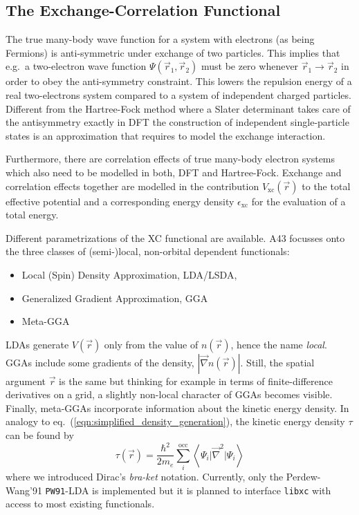 \documentclass[oribibl]{llncs}
\newcommand{\um}[1]{_{\mathrm{#1}}}
\newcommand{\ttt}[1]{\texttt{#1}}
\newcommand{\braketop}[3]{\left\langle \left. #1 \right| #2 \left| #3 \right. \right\rangle}
\newcommand{\codename}{A43}
\begin{document}
\subsection{The Exchange-Correlation Functional} \label{sec:xc-functional}
%
The true many-body wave function for a system with electrons (as being Fermions)
is anti-symmetric under exchange of two particles. 
This implies that e.g.~a two-electron wave function $\Psi(\vec r_1,\vec r_2)$ must be zero 
whenever $\vec r_1 \rightarrow \vec r_2$ in order to obey the anti-symmetry constraint.
This lowers the repulsion energy of a real two-electrons system compared to a
system of independent charged particles.
Different from the Hartree-Fock method where a Slater determinant takes care of the antisymmetry exactly
in \ac{DFT} the construction of independent single-particle states 
is an approximation that requires to model the exchange interaction.

Furthermore, there are correlation effects of true many-body electron systems
which also need to be modelled in both, \ac{DFT} and Hartree-Fock.
Exchange and correlation effects together are modelled in the contribution $V\um{xc}(\vec r)$ 
to the total effective potential and a corresponding energy density $\epsilon\um{xc}$ for the evaluation of a total energy.

Different parametrizations of the \ac{XC} functional are available.
\codename{} focusses onto the three classes of (semi-)local, non-orbital dependent functionals: 
\begin{itemize}
	\item Local (Spin) Density Approximation, LDA/LSDA, 
	\item Generalized Gradient Approximation, GGA
	\item Meta-GGA
\end{itemize}
LDAs generate $V(\vec r)$ only from the value of $n(\vec r)$, 
hence the name \emph{local}. 
GGAs include some gradients of the density, $|\vec \nabla n(\vec r)|$.
Still, the spatial argument $\vec r$ is the same but thinking for example
in terms of finite-difference derivatives on a grid, 
a slightly non-local character of GGAs becomes visible.
Finally, meta-GGAs incorporate information about the kinetic energy density.
In analogy to eq.~(\ref{eqn:simplified_density_generation}), the kinetic energy density $\tau$ can be found by
\begin{equation}
	\tau(\vec r) = \frac{\hbar^2}{2m_e} \sum_i^{\mathrm{occ}} \braketop{ \Psi_i } {\vec \nabla^2 } { \Psi_i } 
	\label{eqn:simplified_kinetic_energy_density_generation}
\end{equation}
where we introduced Dirac's \emph{bra-ket} notation.
Currently, only the 
Perdew-Wang'91 \ttt{PW91}-LDA is implemented
but it is planned to interface \ttt{libxc} with access to most existing functionals.
\end{document}
